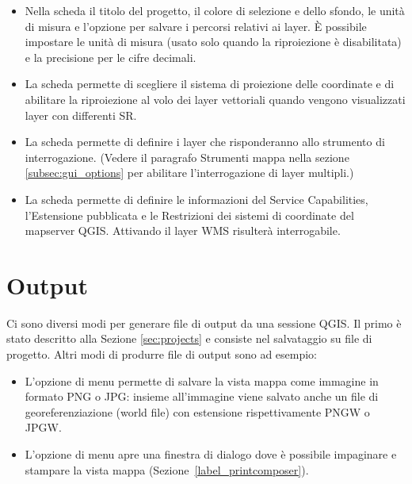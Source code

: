\begin{itemize}
\item Nella scheda  il titolo del progetto, il colore di selezione e dello sfondo, le unità di misura e l'opzione per salvare i percorsi relativi ai layer. È possibile impostare le unità di misura (usato solo quando la riproiezione è disabilitata) e la precisione per le cifre decimali. 
\item La scheda  permette di scegliere il sistema di proiezione delle coordinate e di abilitare la riproiezione al volo dei layer vettoriali quando vengono visualizzati layer con differenti SR.
\item La scheda  permette di definire i layer che risponderanno allo strumento di interrogazione. (Vedere il paragrafo Strumenti mappa nella sezione \ref{subsec:gui_options} per abilitare l'interrogazione di layer multipli.)
\item La scheda  permette di definire le informazioni del Service Capabilities, l'Estensione pubblicata e le Restrizioni dei sistemi di coordinate del mapserver QGIS. Attivando  il layer WMS risulterà interrogabile.
\end{itemize}

\section{Output}\label{sec:output}
Ci sono diversi modi per generare file di output da una sessione QGIS.
Il primo è stato descritto alla Sezione \ref{sec:projects} e consiste nel
salvataggio su file di progetto. 
Altri modi di produrre file di output sono ad esempio:
\begin{itemize}
\item L'opzione di menu  permette di salvare la vista mappa come immagine in formato PNG o JPG: insieme all'immagine viene salvato anche un file di georeferenziazione (world file) con estensione rispettivamente PNGW o JPGW.
\item L'opzione di menu  apre una finestra di dialogo dove è possibile impaginare e stampare la vista mappa (Sezione~\ref{label_printcomposer}).
\end{itemize}

